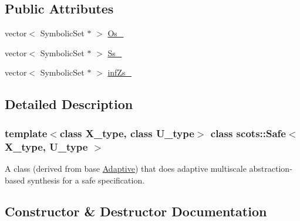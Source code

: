 \subsection*{Public Attributes}
\begin{DoxyCompactItemize}
\item 
vector$<$ Symbolic\+Set $\ast$ $>$ \hyperlink{classscots_1_1Safe_a14fd7c2c700e6a4ea5d6d169febd4289}{Os\+\_\+}
\item 
vector$<$ Symbolic\+Set $\ast$ $>$ \hyperlink{classscots_1_1Safe_a4c272a1e134f26e88c74a08c2703d934}{Ss\+\_\+}
\item 
vector$<$ Symbolic\+Set $\ast$ $>$ \hyperlink{classscots_1_1Safe_a30e38b9a75a8bf34efb2512465ea9468}{inf\+Zs\+\_\+}
\end{DoxyCompactItemize}


\subsection{Detailed Description}
\subsubsection*{template$<$class X\+\_\+type, class U\+\_\+type$>$\newline
class scots\+::\+Safe$<$ X\+\_\+type, U\+\_\+type $>$}

A class (derived from base \hyperlink{classscots_1_1Adaptive}{Adaptive}) that does adaptive multiscale abstraction-\/based synthesis for a safe specification. 

\subsection{Constructor \& Destructor Documentation}
\mbox{\label{classscots_1_1Safe_a40024a9098c70cebc5842a09b46448b8}} 
